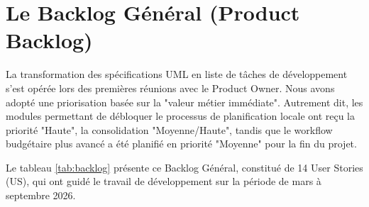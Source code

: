 \section{Le Backlog Général (Product Backlog)}
La transformation des spécifications UML en liste de tâches de développement s'est opérée lors des premières réunions avec le Product Owner. Nous avons adopté une priorisation basée sur la "valeur métier immédiate". Autrement dit, les modules permettant de débloquer le processus de planification locale ont reçu la priorité "Haute", la consolidation "Moyenne/Haute", tandis que le workflow budgétaire plus avancé a été planifié en priorité "Moyenne" pour la fin du projet. 

Le tableau \ref{tab:backlog} présente ce Backlog Général, constitué de 14 User Stories (US), qui ont guidé le travail de développement sur la période de mars à septembre 2026.

